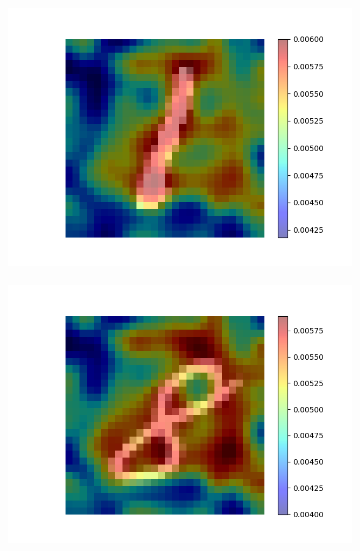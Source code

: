 \documentclass[a4paper]{scrartcl}
\begin{document}
    \begin{figure}[btp]
        \centering
        \begin{subfigure}[t]{0.3\textwidth}
            \centering
            \includegraphics[width=\textwidth]{img/plots/attention_visualization_good_1}
        \end{subfigure}
        \hfill
        \begin{subfigure}[t]{0.3\textwidth}
            \centering
            \includegraphics[width=\textwidth]{img/plots/attention_visualization_middle_1}
        \end{subfigure}
        \hfill
        \begin{subfigure}[t]{0.3\textwidth}

\end{subfigure}
\end{figure}
\end{document}
